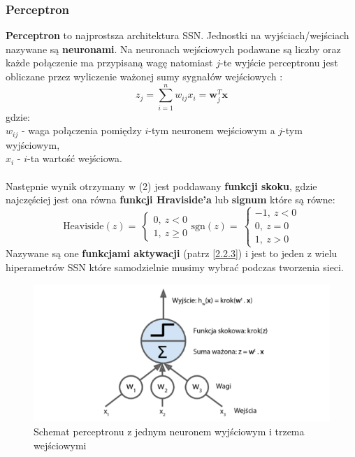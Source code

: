 \documentclass{article}
\renewcommand{\vec}[1]{\mathbf{#1}}
\begin{document}
\subsubsection{Perceptron}
\textbf{Perceptron} to  najprostsza architektura SSN. Jednostki na wyjściach/wejściach
nazywane są \textbf{neuronami}. Na neuronach wejściowych  podawane są liczby oraz
każde połączenie ma przypisaną  wagę natomiast $j$-te wyjście perceptronu jest obliczane przez 
wyliczenie ważonej sumy sygnałów wejściowych \cite{um}:
\begin{equation}
	z_j = \sum_{i=1}^n w_{ij}x_i = \vec{w}_j^T\vec{x}
\end{equation}
gdzie:\\
$w_{ij}$ - waga połączenia pomiędzy $i$-tym neuronem wejściowym a $j$-tym wyjściowym,\\
$x_i$ - $i$-ta wartość wejściowa.\\ \\
Następnie wynik otrzymany w (2) jest poddawany \textbf{funkcji skoku}, gdzie najczęściej jest 
ona równa \textbf{funkcji Hraviside'a} lub \textbf{signum} które są równe:
\[
	\text{Heaviside}(z) = \
	\begin{cases}
		0, \: z < 0 \\
		1, \: z \geq 0
	\end{cases} 
	\text{sgn}(z) = \
	\begin{cases}
		-1, \: z < 0 \\
		0, \: z = 0 \\
		1, \: z > 0
	\end{cases} 
\]
Nazywane są one \textbf{funkcjami aktywacji} (patrz [\hyperref[sec:fa]{2.2.3}])
i jest to jeden z wielu hiperametrów SSN które samodzielnie musimy wybrać podczas
tworzenia sieci.\\

\begin{figure}[H]
\centering
\includegraphics[scale=0.5]{perceptron.png}
\caption{Schemat perceptronu z jednym neuronem wyjściowym i trzema wejściowymi \cite{um}}
\end{figure}
\end{document}
